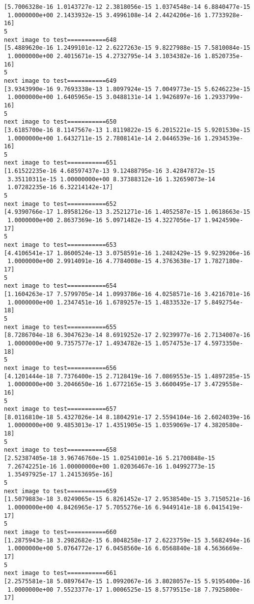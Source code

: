 \documentclass[11pt]{article}
\begin{document}
\begin{Verbatim}[commandchars=\\\{\}]
[5.7006328e-16 1.0143727e-12 2.3818056e-15 1.0374548e-14 6.8840477e-15
 1.0000000e+00 2.1433932e-15 3.4996108e-14 2.4424206e-16 1.7733928e-16]
5
next image to test===========648
[5.4889620e-16 1.2499101e-12 2.6227263e-15 9.8227988e-15 7.5810084e-15
 1.0000000e+00 2.4015671e-15 4.2732795e-14 3.1034382e-16 1.8520735e-16]
5
next image to test===========649
[3.9343990e-16 9.7693338e-13 1.8097924e-15 7.0049773e-15 5.6246223e-15
 1.0000000e+00 1.6405965e-15 3.0488131e-14 1.9426897e-16 1.2933799e-16]
5
next image to test===========650
[3.6185700e-16 8.1147567e-13 1.8119822e-15 6.2015221e-15 5.9201530e-15
 1.0000000e+00 1.6432711e-15 2.7808141e-14 2.0446539e-16 1.2934539e-16]
5
next image to test===========651
[1.61522235e-16 4.68597437e-13 9.12488795e-16 3.42847872e-15
 3.35110311e-15 1.00000000e+00 8.37388312e-16 1.32659073e-14
 1.07282235e-16 6.32214142e-17]
5
next image to test===========652
[4.9390766e-17 1.8958126e-13 3.2521271e-16 1.4052587e-15 1.0618663e-15
 1.0000000e+00 2.8637369e-16 5.0971482e-15 4.3227056e-17 1.9424590e-17]
5
next image to test===========653
[4.4106541e-17 1.8600524e-13 3.0758591e-16 1.2482429e-15 9.9239206e-16
 1.0000000e+00 2.9914091e-16 4.7784008e-15 4.3763638e-17 1.7827180e-17]
5
next image to test===========654
[1.1604263e-17 7.5799705e-14 1.0993786e-16 4.0258571e-16 3.4216701e-16
 1.0000000e+00 1.2347451e-16 1.6789257e-15 1.4833532e-17 5.8492754e-18]
5
next image to test===========655
[8.7286704e-18 6.3047623e-14 8.6919252e-17 2.9239977e-16 2.7134007e-16
 1.0000000e+00 9.7357577e-17 1.4934782e-15 1.0574753e-17 4.5973350e-18]
5
next image to test===========656
[4.1201444e-18 7.7376400e-15 2.7128419e-16 7.0869553e-15 1.4897285e-15
 1.0000000e+00 3.2046650e-16 1.6772165e-15 3.6600495e-17 3.4729558e-16]
5
next image to test===========657
[8.0116810e-18 5.4327026e-14 8.1804291e-17 2.5594104e-16 2.6024039e-16
 1.0000000e+00 9.4853013e-17 1.4351905e-15 1.0359069e-17 4.3820580e-18]
5
next image to test===========658
[2.52387405e-18 3.96746760e-15 1.02541001e-16 5.21700848e-15
 7.26742251e-16 1.00000000e+00 1.02036467e-16 1.04992773e-15
 1.35497925e-17 1.24153695e-16]
5
next image to test===========659
[1.5079883e-18 3.0249065e-15 6.8261452e-17 2.9538540e-15 3.7150521e-16
 1.0000000e+00 4.8426965e-17 5.7055276e-16 6.9449141e-18 6.0415419e-17]
5
next image to test===========660
[1.2875943e-18 3.2982682e-15 6.8048258e-17 2.6223759e-15 3.5682494e-16
 1.0000000e+00 5.0764772e-17 6.0458560e-16 6.0568840e-18 4.5636669e-17]
5
next image to test===========661
[2.2575581e-18 5.0897647e-15 1.0992067e-16 3.8028057e-15 5.9195400e-16
 1.0000000e+00 7.5523377e-17 1.0006525e-15 8.5779515e-18 7.7925800e-17]

\end{Verbatim}
\end{document}
